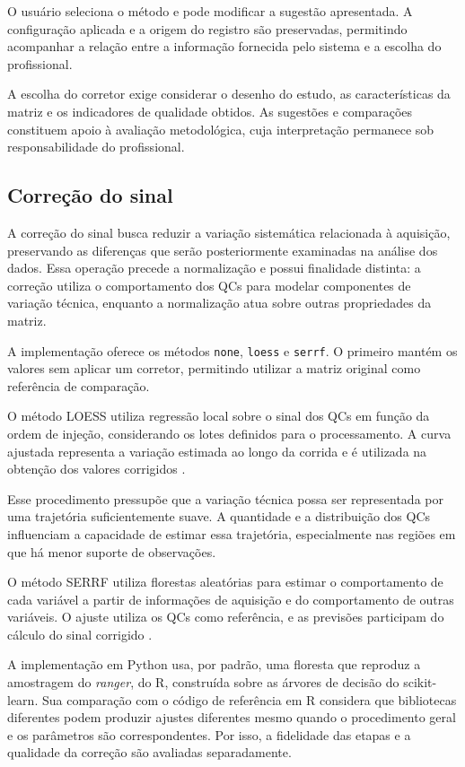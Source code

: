 O usuário seleciona o método e pode modificar a sugestão apresentada. A configuração aplicada e a origem do registro são preservadas, permitindo acompanhar a relação entre a informação fornecida pelo sistema e a escolha do profissional.

A escolha do corretor exige considerar o desenho do estudo, as características da matriz e os indicadores de qualidade obtidos. As sugestões e comparações constituem apoio à avaliação metodológica, cuja interpretação permanece sob responsabilidade do profissional.

\subsection{Correção do sinal}
\label{subsec:correcao-sinal}

A correção do sinal busca reduzir a variação sistemática relacionada à aquisição, preservando as diferenças que serão posteriormente examinadas na análise dos dados. Essa operação precede a normalização e possui finalidade distinta: a correção utiliza o comportamento dos QCs para modelar componentes de variação técnica, enquanto a normalização atua sobre outras propriedades da matriz.

A implementação oferece os métodos \texttt{none}, \texttt{loess} e \texttt{serrf}. O primeiro mantém os valores sem aplicar um corretor, permitindo utilizar a matriz original como referência de comparação.

O método LOESS utiliza regressão local sobre o sinal dos QCs em função da ordem de injeção, considerando os lotes definidos para o processamento. A curva ajustada representa a variação estimada ao longo da corrida e é utilizada na obtenção dos valores corrigidos \cite{dunn2011procedures}.

Esse procedimento pressupõe que a variação técnica possa ser representada por uma trajetória suficientemente suave. A quantidade e a distribuição dos QCs influenciam a capacidade de estimar essa trajetória, especialmente nas regiões em que há menor suporte de observações.

O método SERRF utiliza florestas aleatórias para estimar o comportamento de cada variável a partir de informações de aquisição e do comportamento de outras variáveis. O ajuste utiliza os QCs como referência, e as previsões participam do cálculo do sinal corrigido \cite{fan2019systematic}.

A implementação em Python usa, por padrão, uma floresta que reproduz a amostragem do \textit{ranger}, do R, construída sobre as árvores de decisão do scikit-learn. Sua comparação com o código de referência em R considera que bibliotecas diferentes podem produzir ajustes diferentes mesmo quando o procedimento geral e os parâmetros são correspondentes. Por isso, a fidelidade das etapas e a qualidade da correção são avaliadas separadamente.

